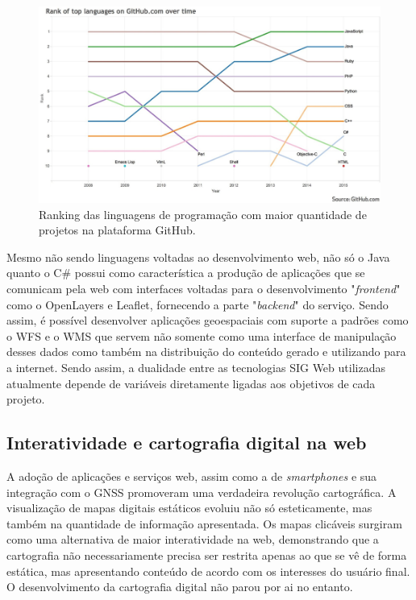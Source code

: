		\begin{figure}
			\centering
			\includegraphics[width=1\linewidth]{data/ranking_github}
			\caption{Ranking das linguagens de programação com maior quantidade de projetos na plataforma GitHub.}
			\label{fig:rankinggithub}
		\end{figure}
		
		Mesmo não sendo linguagens voltadas ao desenvolvimento web, não só o Java quanto o C\# possui como característica a produção de aplicações que se comunicam pela web com interfaces voltadas para o desenvolvimento "\textit{frontend}" como o OpenLayers e Leaflet, fornecendo a parte "\textit{backend}" do serviço. Sendo assim, é possível desenvolver aplicações geoespaciais com suporte a padrões como o WFS e o WMS que servem não somente como uma interface de manipulação desses dados como também na distribuição do conteúdo gerado e utilizando para a internet. Sendo assim, a dualidade entre as tecnologias SIG Web utilizadas atualmente depende de variáveis diretamente ligadas aos objetivos de cada projeto.
		
		\subsection{Interatividade e cartografia digital na web}
		
		A adoção de aplicações e serviços web, assim como a de \textit{smartphones} e sua integração com o GNSS promoveram uma verdadeira revolução cartográfica. A visualização de mapas digitais estáticos evoluiu não só esteticamente, mas também na quantidade de informação apresentada. Os mapas clicáveis surgiram como uma alternativa de maior interatividade na web, demonstrando que a cartografia não necessariamente precisa ser restrita apenas ao que se vê de forma estática, mas apresentando conteúdo de acordo com os interesses do usuário final. O desenvolvimento da cartografia digital não parou por ai no entanto. 
		
